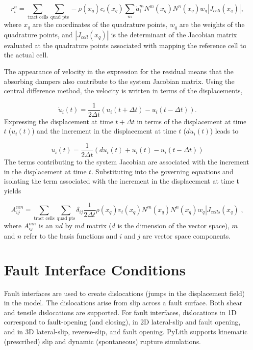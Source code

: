 \begin{equation}
r_{i}^{n}=\sum_{\text{tract cells}}\sum_{\text{quad pts}}-\rho(x_{q})c_{i}(x_{q})\sum_{m}\dot{a}_{i}^{m}N^{m}(x_{q})N^{n}(x_{q})w_{q}|J_{cell}(x_{q})|,
\end{equation}
 where $x_{q}$ are the coordinates of the quadrature points, $w_{q}$
are the weights of the quadrature points, and $|J_{cell}(x_{q})|$
is the determinant of the Jacobian matrix evaluated at the quadrature
points associated with mapping the reference cell to the actual cell.

The appearance of velocity in the expression for the residual means
that the absorbing dampers also contribute to the system Jacobian
matrix. Using the central difference method, the velocity is written
in terms of the displacements,

\begin{equation}
\dot{u}_{i}(t)=\frac{1}{2\Delta t}(u_{i}(t+\Delta t)-u_{i}(t-\Delta t)).
\end{equation}
Expressing the displacement at time $t+\Delta t$ in terms of the
displacement at time $t$ ($u_{i}(t)$) and the increment in the displacement
at time $t$ ($du_{i}(t)$) leads to

\begin{equation}
\dot{u}_{i}(t)=\frac{1}{2\Delta t}(du_{i}(t)+u_{i}(t)-u_{i}(t-\Delta t))
\end{equation}
The terms contributing to the system Jacobian are associated with
the increment in the displacement at time $t$. Substituting into
the governing equations and isolating the term associated with the
increment in the displacement at time t yields

\begin{equation}
A_{ij}^{nm}=\sum_{\text{tract cells}}\sum_{\text{quad pts}}\delta_{ij}\frac{1}{2\Delta t}\rho(x_{q})v_{i}(x_{q})N^{m}(x_{q})N^{n}(x_{q})w_{q}|J_{cells}(x_{q})|,
\end{equation}
where $A_{ij}^{mn}$ is an $nd$ by $md$ matrix ($d$ is the dimension
of the vector space), $m$ and $n$ refer to the basis functions and
$i$ and $j$ are vector space components.


\section{\label{sec:fault}Fault Interface Conditions}

Fault interfaces are used to create dislocations (jumps in the displacement
field) in the model. The dislocations arise from slip across a fault
surface. Both shear and tensile dislocations are supported. For fault
interfaces, dislocations in 1D correspond to fault-opening (and closing),
in 2D lateral-slip and fault opening, and in 3D lateral-slip, reverse-slip,
and fault opening. PyLith supports kinematic (prescribed) slip and
dynamic (spontaneous) rupture simulations.


